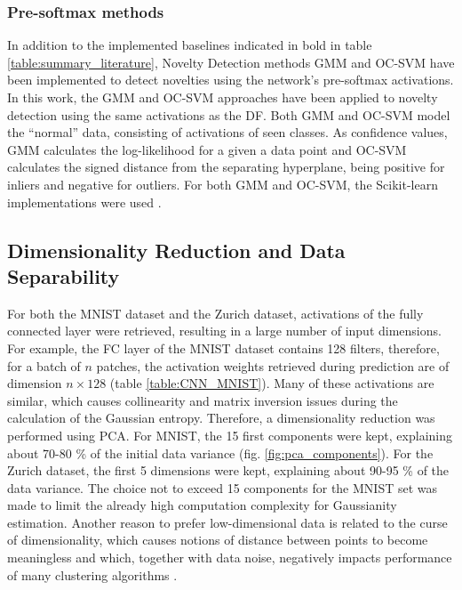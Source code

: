 \documentclass[10pt]{article}
\begin{document}
\subsubsection{Pre-softmax methods} 
In addition to the implemented baselines indicated in bold in table \ref{table:summary_literature}, Novelty Detection methods \gls{GMM} and \gls{OC-SVM} have been implemented to detect novelties using the network's pre-softmax activations. In this work, the \gls{GMM} and \gls{OC-SVM} approaches have been applied to novelty detection using the same activations as the \acrlong{DF}. Both \gls{GMM} and \gls{OC-SVM} model the ``normal'' data, consisting of activations of seen classes. As confidence values, \gls{GMM} calculates the log-likelihood for a given a data point and \gls{OC-SVM} calculates the signed distance from the separating hyperplane, being positive for inliers and negative for outliers. For both \gls{GMM} and \gls{OC-SVM}, the Scikit-learn implementations were used \cite{scikit-learn}.  

\subsection{Dimensionality Reduction and Data Separability}
\label{subsec:methodology-dim-reduction}
For both the \gls{MNIST} dataset and the Zurich dataset, activations of the fully connected layer were retrieved, resulting in a large number of input dimensions. For example, the \gls{FC} layer of the \gls{MNIST} dataset contains 128 filters, therefore, for a batch of $n$ patches, the activation weights retrieved during prediction are of dimension $n \times 128$ (table \ref{table:CNN_MNIST}). Many of these activations are similar, which causes collinearity and matrix inversion issues during the calculation of the Gaussian entropy. Therefore, a dimensionality reduction was performed using \acrfull{PCA}. For \gls{MNIST}, the 15 first components were kept, explaining about 70-80 \% of the initial data variance (fig. \ref{fig:pca_components}). For the Zurich dataset, the first 5 dimensions were kept, explaining about 90-95 \% of the data variance. The choice not to exceed 15 components for the \gls{MNIST} set was made to limit the already high computation complexity for Gaussianity estimation. Another reason to prefer low-dimensional data is related to the curse of dimensionality, which causes notions of distance between points to become meaningless and which, together with data noise, negatively impacts performance of many clustering algorithms \cite{Hinneburg2000WhatIT, Hinneburg1999OptimalGT}. \\
\end{document}
